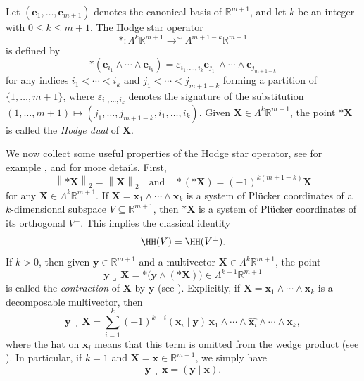 \documentclass[JEP,XML,SOM,Unicode,NoFloatCountersInSection,published]{cedram}
\newcommand\sbw[2]{{{\mathsf{\Lambda}}^{{\!\scriptstyle#1}}{#2}}}
\newcommand\be{\boldsymbol{e}}
\newcommand\bx{\boldsymbol{x}}
\newcommand\by{\boldsymbol{y}}
\newcommand\bX{\boldsymbol{X}}
\newcommand\bR{\mathbb{R}}
\newcommand\ee{\varepsilon}
\newcommand{\norm}[1]{\left\|#1 \right\|_2}
\newcommand{\psc}[2]{\left(#1 \mid #2\right)}
\let\subset \subseteq
\newcommand\AND{\quad\text{and}\quad}
\theoremstyle{definition}
\theoremstyle{plain}
\begin{document}
Let $(\be_1,\dots,\be_{m+1})$ denotes the canonical basis of $\bR^{m+1}$, and let $k$ be an integer with $0\leq k \leq m+1$. The Hodge star operator
\begin{equation*}
* : \sbw{k}{\bR^{m+1}} \mathop{\longrightarrow}^{\sim} \sbw{m+1-k}{\bR^{m+1}}
\end{equation*}
is defined by
\begin{equation*}
*(\be_{i_1}\wedge \cdots \wedge \be_{i_k}) = \ee_{i_1,\dots,i_k}\be_{j_1}\,\wedge \cdots \wedge \be_{j_{m+1-k}}
\end{equation*}
for any indices $i_1 < \cdots < i_k$ and $j_1 < \cdots < j_{m+1-k}$ forming a partition of $\{1,\dots,m+1\}$, where $\ee_{i_1,\dots,i_k}$ denotes the signature of the substitution $(1,\dots,m+1) \mapsto (j_1,\dots,j_{m+1-k}, i_1,\dots,i_k)$. Given $\bX\in \sbw{k}{\bR^{m+1}}$, the point $*\bX$ is called the \emph{Hodge dual} of $\bX$.

We now collect some useful properties of the Hodge star operator, see for example \cite{Hodge}, \cite{bourbakiAlgebre} and \cite[\S 3]{bugeaud2010transfer} for more details. First,
\[
\norm{*\bX} = \norm{\bX} \AND *(*\bX) = (-1)^{k(m+1-k)}\bX
\]
for any $\bX\in \sbw{k}{\bR^{m+1}}$. If $\bX = \bx_1\wedge \cdots \wedge \bx_k$ is a system of Plücker coordinates of a $k$-dimensional subspace $V\subset \bR^{m+1}$, then $*\bX$ is a system of Plücker coordinates of its orthogonal $V^\perp$. This implies the classical identity
\[
\HH(V) = \HH(V^\perp).
\]
If $k>0$, then given $\by\in\bR^{m+1}$ and a multivector $\bX\in \sbw{k}{\bR^{m+1}}$, the point
\begin{equation*}
\by \lrcorner\, \bX = *\big(\by\wedge (*\bX)\big) \in \sbw{k-1}{\bR^{m+1}}
\end{equation*}
is called the \emph{contraction} of $\bX$ by $\by$ (see \cite[Lem.\,2]{bugeaud2010transfer}). Explicitly, if $\bX = \bx_1\wedge \cdots \wedge \bx_k$ is a decomposable multivector, then
\begin{equation}
\label{eq: contraction formule explicite}
\by \lrcorner\, \bX = \sum_{i=1}^{k} (-1)^{k-i} \psc{\bx_i}{\by} \, \bx_1\wedge \cdots \wedge \widehat{\bx_i} \wedge \cdots \wedge \bx_k,
\end{equation}
where the hat on $\bx_i$ means that this term is omitted from the wedge product (see \cite[Eq.\,(3.3)]{bugeaud2010transfer}). In particular, if $k=1$ and $\bX = \bx\in\bR^{m+1}$, we simply have
\begin{equation}
\label{eq: contraction et produit scalaire}
\by \lrcorner\, \bx = \psc{\by}{\bx}.
\end{equation}
\end{document}
